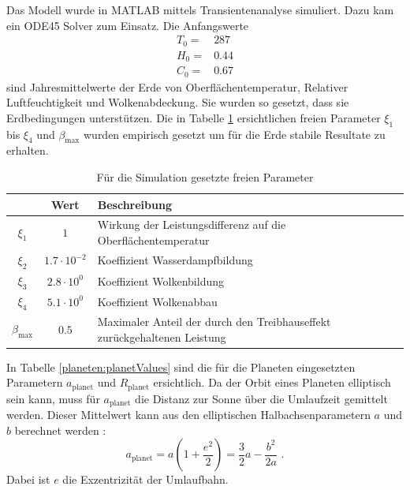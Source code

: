 \begin{refsection}
Das Modell wurde in MATLAB mittels Transientenanalyse simuliert. Dazu kam ein ODE45 Solver zum Einsatz. Die Anfangswerte
\begin{equation}
\begin{matrix}
T_0 = & 287 \\
H_0 = & 0.44 \\
C_0 = & 0.67
\end{matrix}
\end{equation}
sind Jahresmittelwerte der Erde von Oberflächentemperatur, Relativer Luftfeuchtigkeit und Wolkenabdeckung. Sie wurden so gesetzt, dass sie Erdbedingungen unterstützen.
Die in Tabelle \ref{planeten:xiValues} ersichtlichen freien Parameter $\xi_1$ bis $\xi_4$ und $\beta_{\text{max}}$ wurden empirisch gesetzt um für die Erde stabile Resultate zu erhalten.
\begin{center}
\begin{table}[!h]
	\center
	\begin{tabular}{c|c|l}
        & Wert                  & Beschreibung \\
  \hline
$\xi_1$ & $1$					& Wirkung der Leistungsdifferenz auf die Oberflächentemperatur\\
$\xi_2$ & $1.7 \cdot 10^{-2}$	& Koeffizient Wasserdampfbildung\\
$\xi_3$ & $2.8 \cdot 10^{0}$	& Koeffizient Wolkenbildung \\
$\xi_4$ & $5.1 \cdot 10^{0}$	& Koeffizient Wolkenabbau \\
$\beta_{\text{max}}$ & $0.5$	& Maximaler Anteil der durch den Treibhauseffekt zurückgehaltenen Leistung
	\end{tabular}
	\caption{Für die Simulation gesetzte freien Parameter}
	\label{planeten:xiValues}
\end{table}
\end{center}
In Tabelle \ref{planeten:planetValues} sind die für die Planeten eingesetzten Parametern $a_{\text{planet}}$ und $R_{\text{planet}}$ ersichtlich. Da der Orbit eines Planeten elliptisch sein kann, muss für $a_{\text{planet}}$ die Distanz zur Sonne über die Umlaufzeit gemittelt werden. Dieser Mittelwert kann aus den elliptischen Halbachsenparametern $a$ und $b$ berechnet werden \cite{planeten:umlaufbahn}:
\begin{equation}
a_{\text{planet}} = a \left(1+{\frac {e^{2}}{2}}\right) = \frac{3}{2}a - \frac{b^2}{2a} \text{ .}
\end{equation}
Dabei ist $e$ die Exzentrizität der Umlaufbahn.
\begin{center}
\begin{table}[!h]

\end{table}
\end{center}
\end{refsection}
